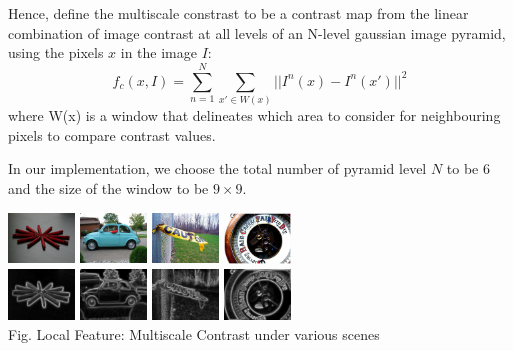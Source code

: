 \documentclass[10pt,twocolumn,letterpaper]{article}
\newcommand{\SUM}{\sum\limits}
\begin{document}
Hence, define the multiscale constrast to be 
a contrast map from the linear combination of image contrast at all levels of an N-level
gaussian image pyramid, using the pixels $x$ in the image $I$:
    $$
    f_c(x,I) = \SUM_{n = 1}^{N}\SUM_{x'\in W(x)}||I^n(x)-I^n(x')||^2
    $$
where W(x) is a window that delineates which area to consider for neighbouring pixels to compare contrast values.

In our implementation, we choose the total number of pyramid level $N$ to be $6$ and 
the size of the window to be $9 \times 9$. 

    \begin{center}
    \includegraphics[width=0.7in,height=0.54in]{./Figures/contrast/1orig.jpg}
    \includegraphics[width=0.7in,height=0.54in]{./Figures/contrast/2orig.jpg}
    \includegraphics[width=0.7in,height=0.54in]{./Figures/contrast/3orig.jpg}
    \includegraphics[width=0.7in,height=0.54in]{./Figures/contrast/4orig.jpg}\\
    \includegraphics[width=0.7in,height=0.54in]{./Figures/contrast/1cont.jpg}
    \includegraphics[width=0.7in,height=0.54in]{./Figures/contrast/2cont.jpg}
    \includegraphics[width=0.7in,height=0.54in]{./Figures/contrast/3cont.jpg}
    \includegraphics[width=0.7in,height=0.54in]{./Figures/contrast/4cont.jpg}\\
    \footnotesize Fig. Local Feature: Multiscale Contrast under various scenes
    \end{center}
\end{document}
